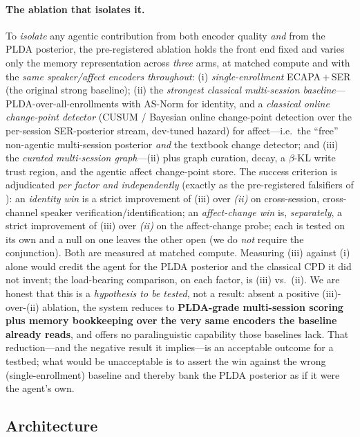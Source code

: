 \paragraph{The ablation that isolates it.} To \emph{isolate} any agentic contribution from both encoder quality \emph{and} from the PLDA posterior, the pre-registered ablation holds the front end fixed and varies only the memory representation across \emph{three} arms, at matched compute and with the \emph{same speaker/affect encoders throughout}: (i) \emph{single-enrollment} ECAPA\,+\,SER (the original strong baseline); (ii) the \emph{strongest classical multi-session baseline}---PLDA-over-all-enrollments with AS-Norm for identity, and a \emph{classical online change-point detector} (CUSUM / Bayesian online change-point detection over the per-session SER-posterior stream, dev-tuned hazard) for affect---i.e.\ the ``free'' non-agentic multi-session posterior \emph{and} the textbook change detector; and (iii) the \emph{curated multi-session graph}---(ii) plus graph curation, decay, a $\beta$-KL write trust region, and the agentic affect change-point store. The success criterion is adjudicated \emph{per factor and independently} (exactly as the pre-registered falsifiers of ): an \emph{identity win} is a strict improvement of (iii) over \emph{(ii)} on cross-session, cross-channel speaker verification/identification; an \emph{affect-change win} is, \emph{separately}, a strict improvement of (iii) over \emph{(ii)} on the affect-change probe; each is tested on its own and a null on one leaves the other open (we do \emph{not} require the conjunction). Both are measured at matched compute. Measuring (iii) against (i) alone would credit the agent for the PLDA posterior and the classical CPD it did not invent; the load-bearing comparison, on each factor, is (iii) vs.\ (ii). We are honest that this is a \emph{hypothesis to be tested}, not a result: absent a positive (iii)-over-(ii) ablation, the system reduces to \textbf{PLDA-grade multi-session scoring plus memory bookkeeping over the very same encoders the baseline already reads}, and offers no paralinguistic capability those baselines lack. That reduction---and the negative result it implies---is an acceptable outcome for a testbed; what would be unacceptable is to assert the win against the wrong (single-enrollment) baseline and thereby bank the PLDA posterior as if it were the agent's own.

\subsection{Architecture}
\label{subsec:arch}

